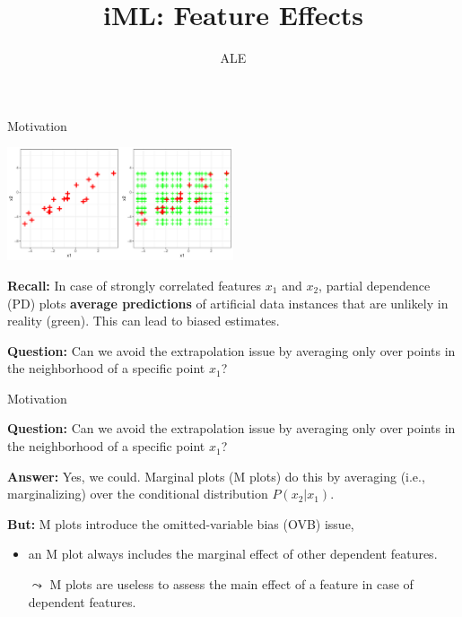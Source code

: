 \documentclass[aspectratio=169]{../latex_main/tntbeamer}  %
\title[Introduction]{iML: Feature Effects}
\subtitle{ALE}
\begin{document}
	
	\maketitle


\begin{frame}[c]{Motivation}

\begin{center}
\includegraphics[width=0.5\textwidth]{figure/pd_grid}
\end{center}

\textbf{Recall:} In case of strongly correlated features $x_1$ and $x_2$, partial dependence (PD) plots \textbf{average predictions} of artificial data instances that are unlikely in reality (green).
This can lead to biased estimates.

\textbf{Question:} Can we avoid the extrapolation issue by averaging only over points in the neighborhood of a specific point $x_1$? 

\end{frame}

\begin{frame}[c]{Motivation}

\textbf{Question:} Can we avoid the extrapolation issue by averaging only over points in the neighborhood of a specific point $x_1$? 
\medskip
\pause

\textbf{Answer:} Yes, we could. Marginal plots (M plots) do this by averaging (i.e., marginalizing) over the conditional distribution $P(x_2|x_1)$.

\medskip
\pause

\textbf{But:} M plots introduce the omitted-variable bias (OVB) issue,\\
\begin{itemize}
    \item an M plot always includes the marginal effect of other dependent features.\\
    \item[$\leadsto$] M plots are useless to assess the main effect of a feature in case of dependent features. 
\end{itemize}

\end{frame}
\end{document}
